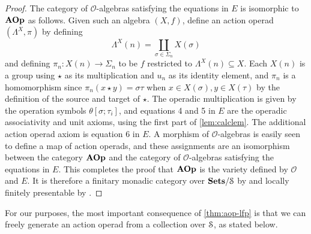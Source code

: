 \begin{proof}
The category of $\mathcal{O}$-algebras satisfying the equations in $E$ is isomorphic to $\mathbf{AOp}$ as follows. Given such an algebra $(X, f)$, define an action operad $(\Lambda^X, \pi)$ by defining 
\[
\Lambda^X(n) = \coprod_{\sigma \in \Sigma_n} X(\sigma)
\]
and defining $\pi_n \colon X(n) \to \Sigma_n$ to be $f$ restricted to $\Lambda^X(n) \subseteq X$. Each $X(n)$ is a group using $\star$ as its multiplication and $u_n$ as its identity element, and $\pi_n$ is a homomorphism since $\pi_n(x \star y) = \sigma \tau$ when $x \in X(\sigma), y \in X(\tau)$ by the definition of the source and target of $\star$. The operadic multiplication is given by the operation symbols $\theta[\sigma; \tau_i]$, and equations 4 and 5 in $E$ are the operadic associativity and unit axioms, using the first part of \cref{lem:calclem}. The additional action operad axiom is equation 6 in $E$. A morphism of $\mathcal{O}$-algebras is easily seen to define a map of action operads, and these assignments are an isomorphism between the category $\mathbf{AOp}$ and the category of $\mathcal{O}$-algebras satisfying the equations in $E$.
This completes the proof that $\mathbf{AOp}$ is the variety defined by $\mathcal{O}$ and $E$. It is therefore a finitary monadic category over $\mathbf{Sets}/\mathcal{S}$ by \cite[Thm~3.18]{ar} and locally finitely presentable by \cite[Cor~3.7]{ar}.
\end{proof}

For our purposes, the most important consequence of \cref{thm:aop-lfp} is that we can freely generate an action operad from a collection over $\mathcal{S}$, as stated below.



